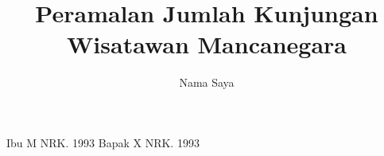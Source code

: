 \title{Peramalan Jumlah Kunjungan Wisatawan Mancanegara} 	%
\author{Nama Saya }		%

\dosbingA%
    {Ibu M}%
    {NRK. 1993}		%
    {}				%
\dosbingB%
	{Bapak X}
   	{NRK. 1993}		%
   	{}				%



\setcounter{page}{0}











\tableofcontents
\listoffigures
\listoftables

